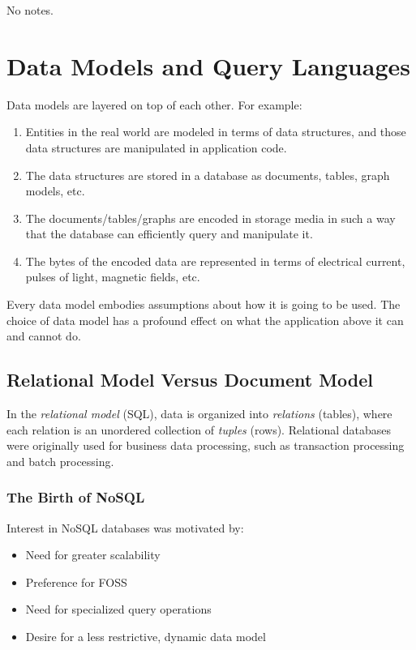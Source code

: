 \documentclass[12pt, titlepage]{article}
\begin{document}
No notes.

\section{Data Models and Query Languages}

Data models are layered on top of each other. For example:

\begin{enumerate}
    \item Entities in the real world are modeled in terms of data structures, and those data structures are manipulated in application code.
    \item The data structures are stored in a database as documents, tables, graph models, etc.
    \item The documents/tables/graphs are encoded in storage media in such a way that the database can efficiently query and manipulate it.
    \item The bytes of the encoded data are represented in terms of electrical current, pulses of light, magnetic fields, etc.
\end{enumerate}

Every data model embodies assumptions about how it is going to be used. The choice of data model has a profound effect on what the application above it can and cannot do.

\subsection{Relational Model Versus Document Model}

In the \textit{relational model} (SQL), data is organized into \textit{relations} (tables), where each relation is an unordered collection of \textit{tuples} (rows). Relational databases were originally used for business data processing, such as transaction processing and batch processing.

\subsubsection{The Birth of NoSQL}

Interest in NoSQL databases was motivated by:

\begin{itemize}
    \item Need for greater scalability
    \item Preference for FOSS
    \item Need for specialized query operations
    \item Desire for a less restrictive, dynamic data model
\end{itemize}
\end{document}
